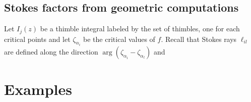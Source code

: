 \documentclass[11pt,a4paper,twoside,leqno,noamsfonts]{amsart}
\numberwithin{equation}{section}
\begin{document}
\subsection{Stokes factors from geometric computations}

Let $I_j(z)$ be a thimble integral labeled by the set of thimbles, one for each critical points and let $\zeta_{\alpha_i}$ be the critical values of $f$. Recall that Stokes rays $\ell_{il}$ are defined along the direction $\arg(\zeta_{\alpha_i}-\zeta_{\alpha_l})$ and 


\section{Examples}   


 
\end{document}
